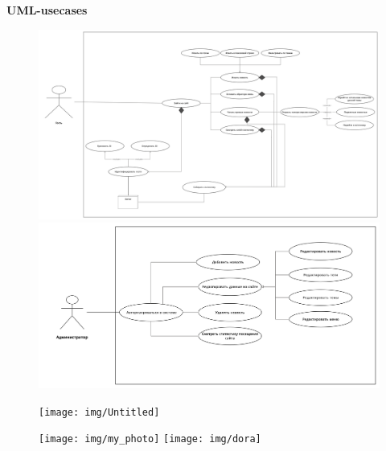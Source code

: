 \begin{center}
    \LARGE
    \textbf{UML-usecases}
    \normalsize
    \begin{figure}[H]
        \centering
        \includegraphics[scale=0.05]{img/Untitled Workspace-9}\\
        \includegraphics[scale=0.08]{img/Untitled Workspace-11}\\
    \end{figure}
\end{center}
\newpage
\BgThispage

\newpage
\BgThispage
\begin{center}
    \begin{figure}[H]
        \centering
        \texttt{[image: img/Untitled]}
    \end{figure}
    \begin{figure}[H]
        \centering
        \texttt{[image: img/my\_photo]}
        \texttt{[image: img/dora]}
    \end{figure}
\end{center}